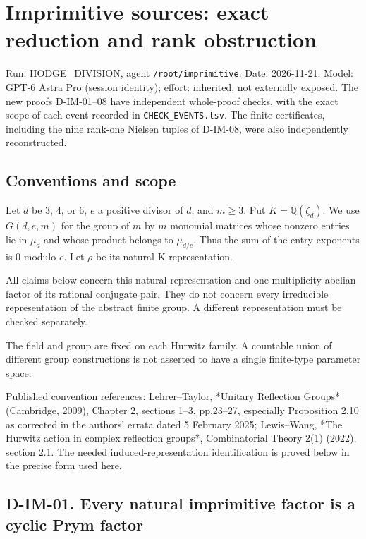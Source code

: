 \section{Imprimitive sources: exact reduction and rank obstruction}

Run: HODGE\_DIVISION, agent \texttt{/root/imprimitive}. Date: 2026-11-21. Model: GPT-6 Astra Pro (session identity); effort: inherited, not externally exposed. The new proofs D-IM-01--08 have independent whole-proof checks, with the exact scope of each event recorded in \texttt{CHECK\_EVENTS.tsv}. The finite certificates, including the nine rank-one Nielsen tuples of D-IM-08, were also independently reconstructed.

\subsection{Conventions and scope}

Let \(d\) be 3, 4, or 6, \(e\) a positive divisor of \(d\), and \(m\geq 3\). Put \(K=\mathbb Q(\zeta_d)\). We use \(G(d,e,m)\) for the group of \(m\) by \(m\) monomial matrices whose nonzero entries lie in \(\mu_d\) and whose product belongs to \(\mu_{d/e}\). Thus the sum of the entry exponents is 0 modulo \(e\). Let \(\rho\) be its natural K-representation.

All claims below concern this natural representation and one multiplicity abelian factor of its rational conjugate pair. They do not concern every irreducible representation of the abstract finite group. A different representation must be checked separately.

The field and group are fixed on each Hurwitz family. A countable union of different group constructions is not asserted to have a single finite-type parameter space.

Published convention references: Lehrer--Taylor, *Unitary Reflection Groups* (Cambridge, 2009), Chapter 2, sections 1--3, pp.23--27, especially Proposition 2.10 as corrected in the authors' errata dated 5 February 2025; Lewis--Wang, *The Hurwitz action in complex reflection groups*, Combinatorial Theory 2(1) (2022), section 2.1. The needed induced-representation identification is proved below in the precise form used here. \cite{IM-LehrerTaylor,IM-LewisWang}

\subsection{D-IM-01. Every natural imprimitive factor is a cyclic Prym factor}
\label{D-IM-01}

